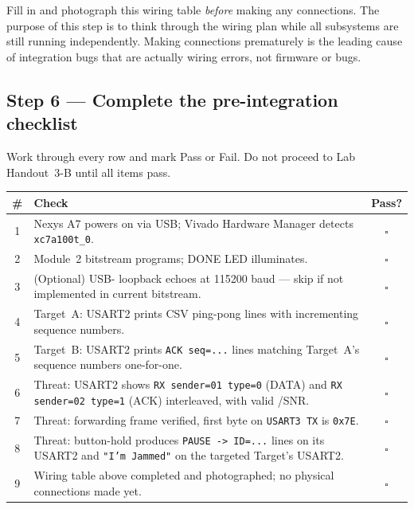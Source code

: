 \documentclass[11pt,letterpaper]{article}
\begin{document}
\begin{tcolorbox}[warning={Do Not Connect Yet}]
	Fill in and photograph this wiring table \emph{before} making any connections. The purpose of this step is to think through the wiring plan while all subsystems are still running independently. Making connections prematurely is the leading cause of integration bugs that are actually wiring errors, not firmware or \RTL{} bugs.
\end{tcolorbox}

\subsection{Step 6 --- Complete the pre-integration checklist}
Work through every row and mark Pass or Fail. Do not proceed to Lab Handout~3-B until all items pass.

\begin{table}[h!]
	\centering
	\renewcommand{\arraystretch}{1.3}
	\begin{tabularx}{\textwidth}{c X c}
		\toprule
		\textbf{\#} & \textbf{Check} & \textbf{Pass?} \\
		\midrule
		1 & Nexys A7 powers on via USB; Vivado Hardware Manager detects \texttt{xc7a100t\_0}. & $\square$ \\
		2 & Module~2 bitstream programs; \mbox{DONE} \mbox{LED} illuminates. & $\square$ \\
		3 & (Optional) \FPGA{} USB-\UART{} loopback echoes at 115200 baud --- skip if not implemented in current bitstream. & $\square$ \\
		4 & Target~A: USART2 prints CSV ping-pong lines with incrementing sequence numbers. & $\square$ \\
		5 & Target~B: USART2 prints \texttt{ACK seq=...} lines matching Target~A's sequence numbers one-for-one. & $\square$ \\
		6 & Threat: USART2 shows \texttt{RX sender=01 type=0} (DATA) and \texttt{RX sender=02 type=1} (ACK) interleaved, with valid \RSSI{}/\mbox{SNR}. & $\square$ \\
		7 & Threat: forwarding frame verified, first byte on \texttt{USART3 TX} is \texttt{0x7E}. & $\square$ \\
		8 & Threat: button-hold produces \texttt{PAUSE -> ID=...} lines on its USART2 and \texttt{"I'm Jammed"} on the targeted Target's USART2. & $\square$ \\
		9 & Wiring table above completed and photographed; no physical connections made yet. & $\square$ \\
		\bottomrule
	\end{tabularx}
\end{table}
\end{document}
